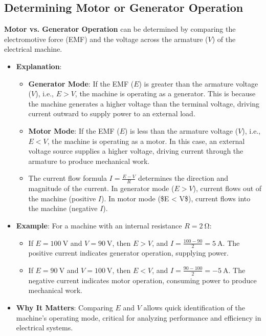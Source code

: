 \documentclass[12pt]{article}
\newcommand{\concept}[1]{\textbf{#1}}
\begin{document}
\subsection{Determining Motor or Generator Operation}
\concept{Motor vs. Generator Operation} can be determined by comparing the electromotive force (EMF) and the voltage across the armature (\(V\)) of the electrical machine.
\begin{itemize}
    \item \textbf{Explanation}: 
        \begin{itemize}
            \item \textbf{Generator Mode}: If the EMF (\(E\)) is greater than the armature voltage (\(V\)), i.e., \(E > V\), the machine is operating as a generator. This is because the machine generates a higher voltage than the terminal voltage, driving current outward to supply power to an external load.
            \item \textbf{Motor Mode}: If the EMF (\(E\)) is less than the armature voltage (\(V\)), i.e., \(E < V\), the machine is operating as a motor. In this case, an external voltage source supplies a higher voltage, driving current through the armature to produce mechanical work.
            \item The current flow formula \(I = \frac{E - V}{R}\) determines the direction and magnitude of the current. In generator mode (\(E > V\)), current flows out of the machine (positive \(I\)). In motor mode (\$E < V\$), current flows into the machine (negative \(I\)).
        \end{itemize}
    \item \textbf{Example}: For a machine with an internal resistance \(R = \SI{2}{\ohm}\):
        \begin{itemize}
            \item If \(E = \SI{100}{\volt}\) and \(V = \SI{90}{\volt}\), then \(E > V\), and \(I = \frac{100 - 90}{2} = \SI{5}{\ampere}\). The positive current indicates generator operation, supplying power.
            \item If \(E = \SI{90}{\volt}\) and \(V = \SI{100}{\volt}\), then \(E < V\), and \(I = \frac{90 - 100}{2} = \SI{-5}{\ampere}\). The negative current indicates motor operation, consuming power to produce mechanical work.
        \end{itemize}
    \item \textbf{Why It Matters}: Comparing \(E\) and \(V\) allows quick identification of the machine’s operating mode, critical for analyzing performance and efficiency in electrical systems.
\end{itemize}
\end{document}
